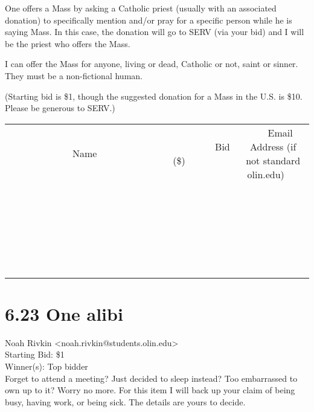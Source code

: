 \documentclass[11pt]{article}
\begin{document}
One offers a Mass by asking a Catholic priest (usually with an associated donation) to specifically mention and/or pray for a specific person while he is saying Mass. In this case, the donation will go to SERV (via your bid) and I will be the priest who offers the Mass.



I can offer the Mass for anyone, living or dead, Catholic or not, saint or sinner. They must be a non-fictional human.



(Starting bid is \$1, though the suggested donation for a Mass in the U.S. is \$10. Please be generous to SERV.) \\
					[6ex]
					\begin{tabular}{c c c}
						~~~~~~~~~~~~~Name~~~~~~~~~~~~~ & ~~~~~~~~~Bid (\$)~~~~~~~~~ & ~~~Email Address (if not standard olin.edu)~~~ \\
				
 & & \\
\hline
 & & \\
\hline
 & & \\
\hline
 & & \\
\hline
 & & \\
\hline
 & & \\
\hline
 & & \\
\hline
 & & \\
\hline
 & & \\
\hline
 & & \\
\hline
 & & \\
\hline
 & & \\
\hline
 & & \\
\hline
 & & \\
\hline
 & & \\
\hline
 & & \\
\hline
 & & \\
\hline
 & & \\
\hline
 & & \\
\hline
 & & \\
\hline
 & & \\
\hline
 & & \\
\hline
 & & \\
\hline
 & & \\
\hline
 & & \\
\hline
 & & \\
\hline
					\end{tabular}
					\clearpage
				
					\section*{6.23 One alibi}
					Noah Rivkin <noah.rivkin@students.olin.edu> \\
					Starting Bid: \$1 \\
					Winner(s): Top bidder \\
					Forget to attend a meeting? Just decided to sleep instead? Too embarrassed to own up to it? Worry no more. For this item I will back up your claim of being busy, having work, or being sick. The details are yours to decide. 
\end{document}

